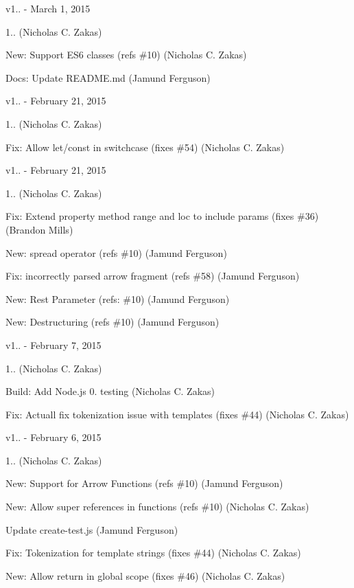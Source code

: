 v1.. -\/ March 1, 2015


\begin{DoxyItemize}
\item 1.. (Nicholas C. Zakas)
\item New\+: Support E\+S6 classes (refs \#10) (Nicholas C. Zakas)
\item Docs\+: Update R\+E\+A\+D\+M\+E.\+md (Jamund Ferguson)
\end{DoxyItemize}

v1.. -\/ February 21, 2015


\begin{DoxyItemize}
\item 1.. (Nicholas C. Zakas)
\item Fix\+: Allow let/const in switchcase (fixes \#54) (Nicholas C. Zakas)
\end{DoxyItemize}

v1.. -\/ February 21, 2015


\begin{DoxyItemize}
\item 1.. (Nicholas C. Zakas)
\item Fix\+: Extend property method range and loc to include params (fixes \#36) (Brandon Mills)
\item New\+: spread operator (refs \#10) (Jamund Ferguson)
\item Fix\+: incorrectly parsed arrow fragment (refs \#58) (Jamund Ferguson)
\item New\+: Rest Parameter (refs\+: \#10) (Jamund Ferguson)
\item New\+: Destructuring (refs \#10) (Jamund Ferguson)
\end{DoxyItemize}

v1.. -\/ February 7, 2015


\begin{DoxyItemize}
\item 1.. (Nicholas C. Zakas)
\item Build\+: Add Node.\+js 0. testing (Nicholas C. Zakas)
\item Fix\+: Actuall fix tokenization issue with templates (fixes \#44) (Nicholas C. Zakas)
\end{DoxyItemize}

v1.. -\/ February 6, 2015


\begin{DoxyItemize}
\item 1.. (Nicholas C. Zakas)
\item New\+: Support for Arrow Functions (refs \#10) (Jamund Ferguson)
\item New\+: Allow super references in functions (refs \#10) (Nicholas C. Zakas)
\item Update create-\/test.\+js (Jamund Ferguson)
\item Fix\+: Tokenization for template strings (fixes \#44) (Nicholas C. Zakas)
\item New\+: Allow return in global scope (fixes \#46) (Nicholas C. Zakas)
\end{DoxyItemize}

